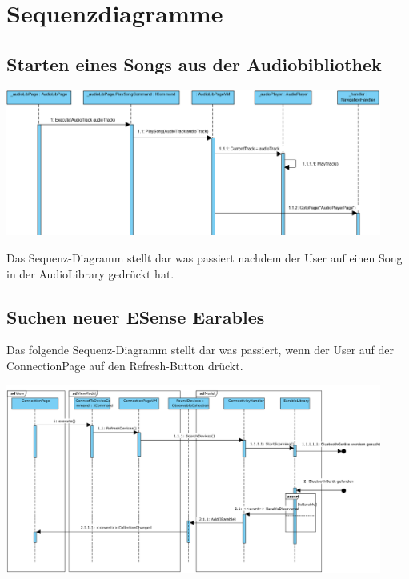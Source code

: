\documentclass[../entwurf.tex]{subfiles}
\begin{document}
\section{Sequenzdiagramme}
\subsection{Starten eines Songs aus der Audiobibliothek}
\begin{center}
	\includegraphics[page=1,width=350pt,keepaspectratio]{../graphics/sequenz_diagramme/PlaySongSequenzDia.png}
\end{center}
Das Sequenz-Diagramm stellt dar was passiert nachdem der User auf einen Song in der AudioLibrary gedrückt hat.

\subsection{Suchen neuer ESense Earables}
Das folgende Sequenz-Diagramm stellt dar was passiert, wenn der User auf der ConnectionPage auf den Refresh-Button drückt.
\begin{center}
	\includegraphics[page=1,width=350pt,keepaspectratio]{../graphics/sequenz_diagramme/RefreshFoundDevices.png}
\end{center}
\end{document}
